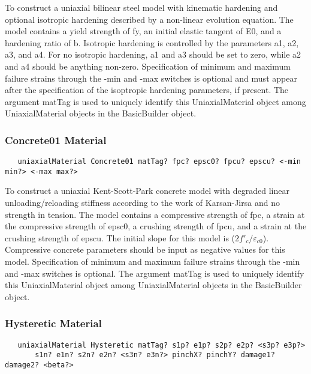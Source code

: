\documentclass[12pt]{article}
\begin{document}
\noindent To construct a uniaxial bilinear steel model with kinematic
hardening and optional isotropic hardening described by a non-linear
evolution equation. The model contains a yield strength of fy, an
initial elastic tangent of E0, and a hardening ratio of b. Isotropic hardening is
controlled by the parameters a1, a2, a3, and a4. For no isotropic hardening, a1 and
a3 should be set to zero, while a2 and a4 should be anything non-zero.
Specification of minimum and maximum failure strains 
through the -min and -max switches is optional and must appear after
the specification of the isoptropic hardening parameters, if
present. The argument matTag is used to uniquely identify this
UniaxialMaterial object among UniaxialMaterial objects in the
BasicBuilder object. 

\subsubsection{Concrete01 Material}
{\sf\small
\begin{verbatim}
   uniaxialMaterial Concrete01 matTag? fpc? epsc0? fpcu? epscu? <-min min?> <-max max?>
\end{verbatim}
}

\noindent To construct a uniaxial Kent-Scott-Park concrete model with degraded 
linear unloading/reloading stiffness according to the work of Karsan-Jirsa and no
strength in tension. The model contains a compressive strength of fpc,
a strain at the compressive strength of epsc0, a crushing strength of
fpcu, and a strain at the crushing strength of epscu. The initial slope
for this model is ($2f'_c/\varepsilon_{c0}$). Compressive
concrete parameters should be input as negative values for
this model. Specification of minimum and maximum
failure strains through the -min and -max switches is optional. The argument 
matTag is used to uniquely identify this UniaxialMaterial object among 
UniaxialMaterial objects in the BasicBuilder object.

\subsubsection{Hysteretic Material}
{\sf\small
\begin{verbatim}
   uniaxialMaterial Hysteretic matTag? s1p? e1p? s2p? e2p? <s3p? e3p?>
       s1n? e1n? s2n? e2n? <s3n? e3n?> pinchX? pinchY? damage1? damage2? <beta?>
\end{verbatim}
}
\end{document}
